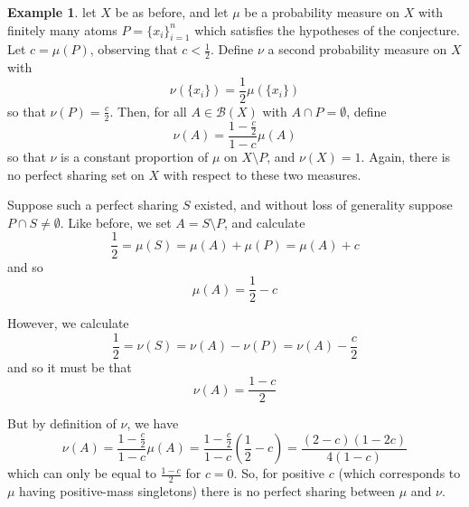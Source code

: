 \documentclass[12pt]{article}
\theoremstyle{definition}
\newtheorem{example}{Example}
\begin{document}
\begin{example}
    let $X$ be as before, and let $\mu$ be a probability measure on $X$ with
    finitely many atoms $P = \{x_i\}_{i=1}^n$ which satisfies the hypotheses of
    the conjecture. Let $c=\mu(P)$, observing that $c<\frac{1}{2}$. Define $\nu$
    a second probability measure on $X$ with
    \[
        \nu(\{x_i\}) = \frac{1}{2}\mu(\{x_i\})
    \]
    so that $\nu(P) = \frac{c}{2}$. Then, for all $A\in\mathscr{B}(X)$ with
    $A\cap P = \emptyset$, define
    \[
        \nu(A) = \frac{1-\frac{c}{2}}{1-c}\mu(A)
    \]
    so that $\nu$ is a constant proportion of $\mu$ on $X\setminus P$, and
    $\nu(X) = 1$. Again, there is no perfect sharing set on $X$ with respect to
    these two measures.

    Suppose such a perfect sharing $S$ existed, and without loss of generality
    suppose $P\cap S\neq \emptyset$. Like before, we set $A=S\setminus P$, and
    calculate
    \[
        \frac{1}{2} = \mu(S) = \mu(A) + \mu(P) = \mu(A) + c
    \]
    and so
    \[
        \mu(A) = \frac{1}{2} - c
    \]

    However, we calculate
    \[
        \frac{1}{2} = \nu(S) = \nu(A) - \nu(P) = \nu(A) - \frac{c}{2}
    \]
    and so it must be that
    \[
        \nu(A) = \frac{1-c}{2}
    \]
    
    But by definition of $\nu$, we have
    \[
        \nu(A) = \frac{1-\frac{c}{2}}{1-c}\mu(A) =
        \frac{1-\frac{c}{2}}{1-c}(\frac{1}{2}-c) =
        \frac{(2-c)(1-2c)}{4(1-c)}
    \]
    which can only be equal to $\frac{1-c}{2}$ for $c=0$. So, for positive $c$
    (which corresponds to $\mu$ having positive-mass singletons) there is no
    perfect sharing between $\mu$ and $\nu$.
\end{example}
\end{document}
